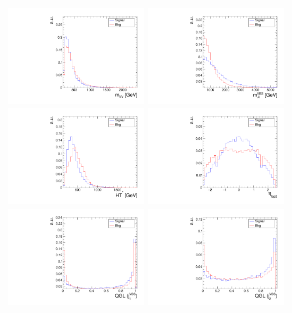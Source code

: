 \begin{figure}[!ht]
  \centering
  \includegraphics[width=0.32\textwidth]{analysis_plots/tmva_plots/zjj_BDTG14_dibos_m.pdf}
  \includegraphics[width=0.32\textwidth]{analysis_plots/tmva_plots/zjj_BDTG14_vbf_m.pdf} \\
  \includegraphics[width=0.32\textwidth]{analysis_plots/tmva_plots/zjj_BDTG14_ht_resolved.pdf}
  \includegraphics[width=0.32\textwidth]{analysis_plots/tmva_plots/zjj_BDTG14_lep2_eta.pdf} \\
  \includegraphics[width=0.32\textwidth]{analysis_plots/tmva_plots/zjj_BDTG14_vbf1_AK4_qgid.pdf}
  \includegraphics[width=0.32\textwidth]{analysis_plots/tmva_plots/zjj_BDTG14_vbf2_AK4_qgid.pdf}

\end{figure}
